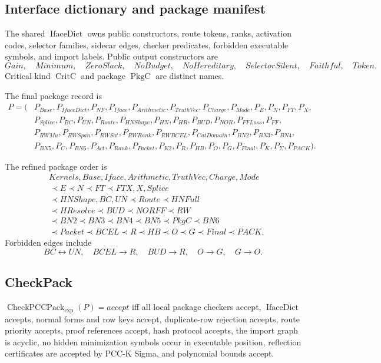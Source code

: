 \documentclass[10.5pt,a4paper]{article}
\newcommand{\CheckPack}{\operatorname{CheckPCCPack}_{\exp}}
\newcommand{\IfaceDict}{\operatorname{IfaceDict}}
\newcommand{\CritC}{\operatorname{CritC}}
\newcommand{\PkgC}{\operatorname{PkgC}}
\begin{document}
\subsection{Interface dictionary and package manifest}
The shared \(\IfaceDict\) owns public constructors, route tokens, ranks, activation codes, selector families, sidecar edges, checker predicates, forbidden executable symbols, and import labels. Public output constructors are
\[
Gain,
\quad Minimum,
\quad ZeroSlack,
\quad NoBudget,
\quad NoHereditary,
\quad SelectorSilent,
\quad Faithful,
\quad Token.
\]
Critical kind \(\CritC\) and package \(\PkgC\) are distinct names.

The final package record is
\[
\begin{aligned}
P=(&P_{Base},P_{IfaceDict},P_{NF},P_{Iface},P_{Arithmetic},P_{TruthVec},P_{Charge},P_{Mode},P_E,P_N,P_{FT},P_X,\\
&P_{Splice},P_{BC},P_{UN},P_{Route},P_{HNShape},P_{HN},P_{HR},P_{BUD},P_{NOR},P_{FFLoss},P_{FF},\\
&P_{RWMu},P_{RWSpan},P_{RWSat},P_{RWRank},P_{RWBCEL},P_{CutDomain},P_{BN2},P_{BN3},P_{BN4},\\
&P_{BN5},P_C,P_{BN6},P_{Act},P_{Rank},P_{Packet},P_{K2},P_R,P_{HB},P_O,P_G,P_{Final},P_K,P_\Sigma,P_{PACK}).
\end{aligned}
\]

The refined package order is
\[
\begin{aligned}
&Kernels,Base,Iface,Arithmetic,TruthVec,Charge,Mode\\
&\prec E\prec N\prec FT\prec FTX,X,Splice\\
&\prec HNShape,BC,UN\prec Route\prec HNFull\\
&\prec HResolve\prec BUD\prec NORFF\prec RW\\
&\prec BN2\prec BN3\prec BN4\prec BN5\prec PkgC\prec BN6\\
&\prec Packet\prec BCEL\prec R\prec HB\prec O\prec G\prec Final\prec PACK.
\end{aligned}
\]
Forbidden edges include
\[
BC\leftrightarrow UN,
\quad BCEL\to R,
\quad BUD\to R,
\quad O\to G,
\quad G\to O.
\]

\subsection{CheckPack}
\(\CheckPack(P)=accept\) iff all local package checkers accept, \(\IfaceDict\) accepts, normal forms and row keys accept, duplicate-row rejection accepts, route priority accepts, proof references accept, hash protocol accepts, the import graph is acyclic, no hidden minimization symbols occur in executable position, reflection certificates are accepted by PCC-K Sigma, and polynomial bounds accept.
\end{document}

